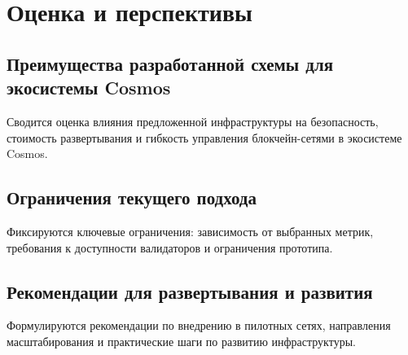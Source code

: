 \chapter{Оценка и перспективы}\label{ch:ch7}

\section{Преимущества разработанной схемы для экосистемы Cosmos}\label{sec:ch7/sec1}

Сводится оценка влияния предложенной инфраструктуры на безопасность, стоимость
развертывания и гибкость управления блокчейн-сетями в экосистеме Cosmos.

\section{Ограничения текущего подхода}\label{sec:ch7/sec2}

Фиксируются ключевые ограничения: зависимость от выбранных метрик, требования к
доступности валидаторов и ограничения прототипа.

\section{Рекомендации для развертывания и развития}\label{sec:ch7/sec3}

Формулируются рекомендации по внедрению в пилотных сетях, направления
масштабирования и практические шаги по развитию инфраструктуры.
